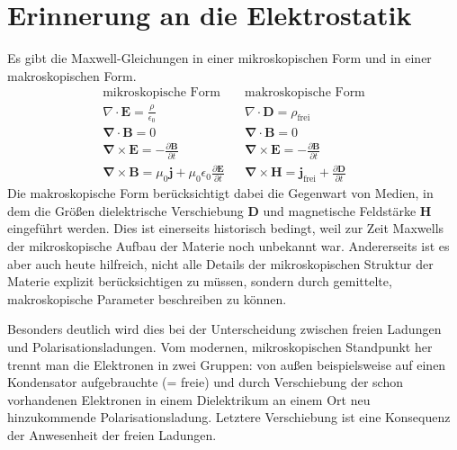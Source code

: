 \section{Erinnerung an die Elektrostatik }

Es gibt die Maxwell-Gleichungen in einer mikroskopischen Form und in einer makroskopischen Form.
%
\begin{align}
\text{mikroskopische Form} & &
\text{makroskopische Form} \nonumber \\
%
 \nabla\cdot\mathbf{E}= \frac{\rho}{\epsilon_0} & &
 \nabla\cdot\mathbf{D}= \rho_{\text{frei}} \\
%
\mathbf\nabla\cdot\mathbf{B}=0
 & &
\mathbf\nabla\cdot\mathbf{B}=0 \\
%
\mathbf\nabla\times\mathbf{E}=-\frac{\partial\mathbf{B}}{\partial t}  
& &
\mathbf\nabla\times\mathbf{E}=-\frac{\partial\mathbf{B}}{\partial t} \\
%
\mathbf\nabla\times\mathbf{B}= \mu_0\mathbf{j}+\mu_0\epsilon_0\frac{\partial\mathbf{E}}{\partial t}  & &
\mathbf\nabla\times\mathbf{H}= \mathbf{j}_{\text{frei}}+\frac{\partial\mathbf{D}}{\partial t}
\end{align}
%
Die makroskopische Form berücksichtigt dabei die Gegenwart von Medien, in dem die Größen dielektrische Verschiebung $\mathbf{D}$ und magnetische Feldstärke $\mathbf{H}$ eingeführt werden. Dies ist einerseits historisch bedingt, weil zur Zeit Maxwells der mikroskopische Aufbau der Materie noch unbekannt war. Andererseits ist es aber auch heute hilfreich, nicht alle Details der mikroskopischen Struktur der Materie explizit berücksichtigen zu müssen, sondern durch gemittelte, makroskopische Parameter beschreiben zu können.

Besonders deutlich wird dies bei der Unterscheidung zwischen freien Ladungen und Polarisationsladungen.  Vom modernen, mikroskopischen Standpunkt her trennt man die Elektronen in zwei Gruppen: von außen beispielsweise auf einen Kondensator aufgebrauchte (= freie) und durch Verschiebung der schon vorhandenen Elektronen in einem Dielektrikum an einem Ort neu hinzukommende Polarisationsladung. Letztere Verschiebung ist eine Konsequenz der Anwesenheit der freien Ladungen.

